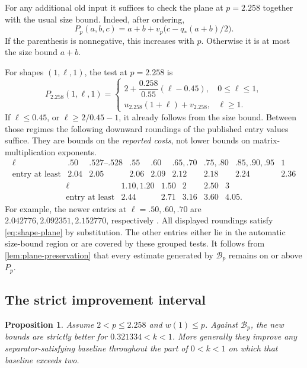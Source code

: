 \documentclass[11pt]{article}
\numberwithin{equation}{section}
\newtheorem{proposition}[theorem]{Proposition}
\theoremstyle{definition}
\theoremstyle{remark}
\begin{document}
For any additional old input it suffices to check the plane at
\(p=2.258\) together with the usual size bound.
Indeed, after ordering,
\[
 P_p(a,b,c)=a+b+v_p\bigl(c-q_*(a+b)/2\bigr).
\]
If the parenthesis is nonnegative, this increases with \(p\).
Otherwise it is at most the size bound \(a+b\).

For shapes \((1,\ell,1)\), the test at \(p=2.258\) is
\begin{equation}\label{eq:shape-plane}
 P_{2.258}(1,\ell,1)=
 \begin{cases}
  2+\dfrac{0.258}{0.55}(\ell-0.45),&0\le\ell\le1,\\[2mm]
  u_{2.258}(1+\ell)+v_{2.258},&\ell\ge1.
 \end{cases}
\end{equation}
If \(\ell\le0.45\), or \(\ell\ge2/0.45-1\), it already follows
from the size bound.
Between those regimes the following downward roundings of the
published entry values suffice.  They are bounds on the \emph{reported
costs}, not lower bounds on matrix-multiplication exponents.
\[
\begin{array}{c|rrrrrrrr}
\ell&.50&.527\text{--}.528&.55&.60&.65,.70&
 .75,.80&.85,.90,.95&1\\ \hline
\text{entry at least}&2.04&2.05&2.06&2.09&2.12&2.18&2.24&2.36
\end{array}
\]
\[
\begin{array}{c|rrrrr}
\ell&1.10,1.20&1.50&2&2.50&3\\ \hline
\text{entry at least}&2.44&2.71&3.16&3.60&4.05.
\end{array}
\]
For example, the newer entries at \(\ell=.50,.60,.70\) are
\(2.042776,2.092351,2.152770\), respectively \cite{advxxz}.
All displayed roundings satisfy \eqref{eq:shape-plane} by substitution.
The other entries either lie in the automatic size-bound region or
are covered by these grouped tests.
It follows from \cref{lem:plane-preservation} that every estimate
generated by \(\mathcal B_p\) remains on or above \(P_p\).

\subsection{The strict improvement interval}

\begin{proposition}\label{prop:comparison}
Assume \(2<p\le2.258\) and \(w(1)\le p\).
Against \(\mathcal B_p\), the new bounds are strictly better for
\(0.321334<k<1\).
More generally they improve any separator-satisfying baseline
throughout the part of \(0<k<1\) on which that baseline exceeds two.
\end{proposition}
\end{document}

